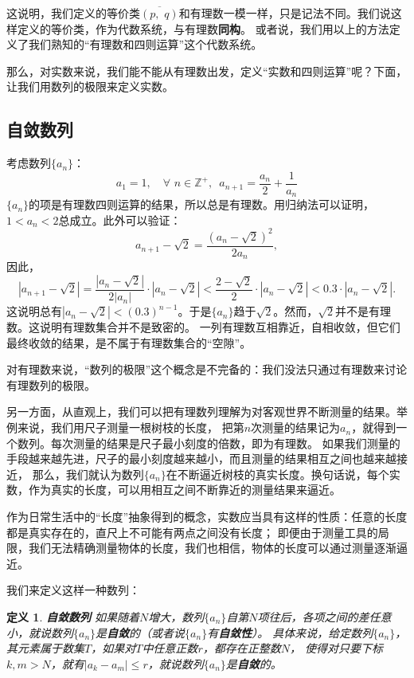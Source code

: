 \documentclass[12pt,UTF8]{ctexbook}
\newtheorem{df}{定义}[section]
\begin{document}
这说明，我们定义的等价类$\overline{(p,\,\, q)}$和有理数一模一样，只是记法不同。我们说这样定义的等价类，作为代数系统，与有理数\textbf{同构}。
或者说，我们用以上的方法定义了我们熟知的“有理数和四则运算”这个代数系统。

那么，对实数来说，我们能不能从有理数出发，定义“实数和四则运算”呢？下面，让我们用数列的极限来定义实数。

\subsection{自敛数列}

考虑数列$\{a_n\}$：
$$ a_1 = 1, \quad \forall \,\, n \in \mathbb{Z}^+, \,\,\, a_{n+1} = \frac{a_n}{2} + \frac{1}{a_n} $$
$\{a_n\}$的项是有理数四则运算的结果，所以总是有理数。用归纳法可以证明，$1 < a_n < 2$总成立。此外可以验证：
$$ a_{n+1} - \sqrt{2} = \frac{(a_n - \sqrt{2})^2}{2a_n},$$
因此，
$$ |a_{n+1} - \sqrt{2}| = \frac{|a_n - \sqrt{2}|}{2|a_n|} \cdot |a_n - \sqrt{2}| < \frac{2 - \sqrt{2}}{2} \cdot |a_n - \sqrt{2}| < 0.3\cdot |a_n - \sqrt{2}|. $$
这说明总有$|a_n - \sqrt{2}| < (0.3)^{n-1}$。于是$\{a_n\}$趋于$\sqrt{2}$。然而，$\sqrt{2}$并不是有理数。这说明有理数集合并不是致密的。
一列有理数互相靠近，自相收敛，但它们最终收敛的结果，是不属于有理数集合的“空隙”。

对有理数来说，“数列的极限”这个概念是不完备的：我们没法只通过有理数来讨论有理数列的极限。

另一方面，从直观上，我们可以把有理数列理解为对客观世界不断测量的结果。举例来说，我们用尺子测量一根树枝的长度，
把第$n$次测量的结果记为$a_n$，就得到一个数列。每次测量的结果是尺子最小刻度的倍数，即为有理数。
如果我们测量的手段越来越先进，尺子的最小刻度越来越小，而且测量的结果相互之间也越来越接近，
那么，我们就认为数列$\{a_n\}$在不断逼近树枝的真实长度。换句话说，每个实数，作为真实的长度，可以用相互之间不断靠近的测量结果来逼近。

作为日常生活中的“长度”抽象得到的概念，实数应当具有这样的性质：任意的长度都是真实存在的，直尺上不可能有两点之间没有长度；
即便由于测量工具的局限，我们无法精确测量物体的长度，我们也相信，物体的长度可以通过测量逐渐逼近。

我们来定义这样一种数列：
\begin{df}\textbf{自敛数列}
    如果随着$N$增大，数列$\{a_n\}$自第$N$项往后，各项之间的差任意小，就说数列$\{a_n\}$是\textbf{自敛}的（或者说$\{a_n\}$有\textbf{自敛性}）。
    具体来说，给定数列$\{a_n\}$，其元素属于数集$T$，如果对$T$中任意正数$r$，都存在正整数$N$，
    使得对只要下标$k,m>N$，就有$|a_k - a_m| \leqslant r$，就说数列$\{a_n\}$是\textbf{自敛}的。
\end{df}
\end{document}
